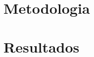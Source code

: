\documentclass[
	12pt,				  %
  oneside,			%
	a4paper,			%
	english,			%
	french,				%
	spanish,			%
	brazil,				%
	]{abntex2}
\begin{document}
  
  \frenchspacing 
  
  
  \imprimircapa

  \imprimirfolhaderosto*
  
%  
 
  

  
  
  
  
  
  
 
  
  \tableofcontents*
  \cleardoublepage

  \textual
  
  
  
  \part{Metodologia}
  
  
  
  \part{Resultados}
  
\end{document}
